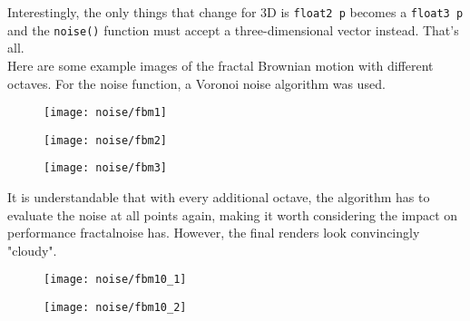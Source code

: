 \noindent
Interestingly, the only things that change for 3D is \lstinline[language=HLSL]{float2 p} becomes a \lstinline[language=HLSL]{float3 p} and the \lstinline[language=HLSL]{noise()} function must accept a three-dimensional vector instead. That's all.
\\
Here are some example images of the fractal Brownian motion with different octaves. For the noise function, a Voronoi noise algorithm was used.
\begin{figure}[H]
    \centering
        \begin{minipage}{0.3\linewidth}
            \texttt{[image: noise/fbm1]}
            \label{img:noise:fbm1}
        \end{minipage}
        \hfill
        \begin{minipage}{0.3\linewidth}
            \texttt{[image: noise/fbm2]}
            \label{img:noise:fbm2}
            \end{minipage}
        \hfill
        \begin{minipage}{0.3\linewidth}
            \texttt{[image: noise/fbm3]}
            \label{img:noise:fbm6}
        \end{minipage}
\end{figure}

\noindent
It is understandable that with every additional octave, the algorithm has to evaluate the noise at all points again, making it worth considering the impact on performance \gls{fractalnoise} has.
However, the final renders look convincingly "cloudy".

\begin{figure}[H]
    \centering
        \begin{minipage}{0.47\linewidth}
            \texttt{[image: noise/fbm10\_1]}
            \label{img:noise:fbm10_1}
        \end{minipage}
    \hfill
        \begin{minipage}{0.47\linewidth}
            \texttt{[image: noise/fbm10\_2]}
            \label{img:noise:fbm10_2}
        \end{minipage}
\end{figure}